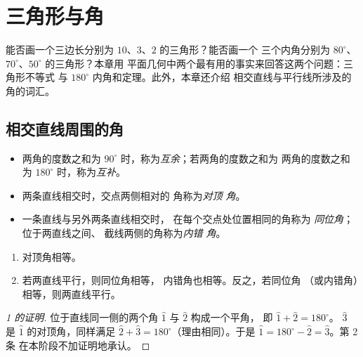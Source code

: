 \chapter{三角形与角}\label{ch:g7:triangles}

能否画一个三边长分别为 $10$、$3$、$2$ 的三角形？能否画一个
三个内角分别为 $80^\circ$、$70^\circ$、$50^\circ$ 的三角形？本章用
平面几何中两个最有用的事实来回答这两个问题：三角形不等式
与 $180^\circ$ 内角和定理。此外，本章还介绍
相交直线与平行线所涉及的角的词汇。

\section{相交直线周围的角}

\begin{definition}[成对的角]\label{def:g7:triangles:pairs}
\begin{itemize}
  \item 两角的度数之和为 $90^\circ$ 时，称为\emph{互余}；若两角的度数之和为
        两角的度数之和为
        $180^\circ$ 时，称为\emph{互补}。
  \item 两条直线相交时，交点两侧相对的
        角称为\emph{对顶
        角}。
  \item 一条直线与另外两条直线相交时，
        在每个交点处位置相同的角称为
        \emph{同位角}；位于两直线之间、
        截线两侧的角称为\emph{内错
        角}。
\end{itemize}
\end{definition}

\begin{theorem}[角的相等关系]\label{thm:g7:triangles:equalities}
\begin{enumerate}
  \item 对顶角相等。
  \item 若两直线平行，则同位角相等，
        内错角也相等。反之，若同位角
        （或内错角）相等，则两直线平行。
\end{enumerate}
\end{theorem}

\begin{proof}[1 的证明]
位于直线同一侧的两个角 $\widehat{1}$ 与 $\widehat{2}$ 构成一个平角，
即 $\widehat 1 + \widehat 2 = 180^\circ$。
$\widehat 3$ 是 $\widehat 1$ 的对顶角，同样满足
$\widehat 2 + \widehat 3 = 180^\circ$（理由相同）。于是
$\widehat 1 = 180^\circ - \widehat 2 = \widehat 3$。第 2 条
在本阶段不加证明地承认。
\end{proof}

